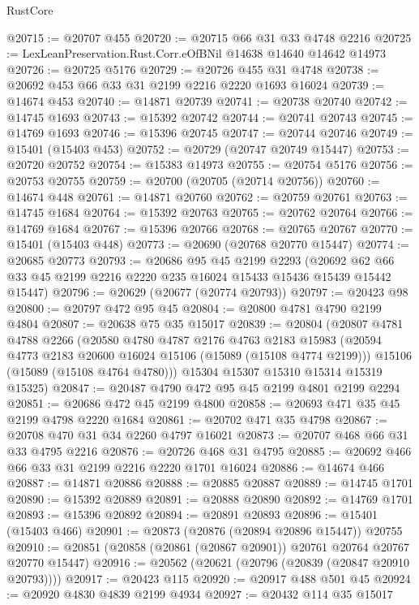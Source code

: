 \begin{lexlean}{RustCore}
\begin{coremodule}
@20715 := @20707 @455
@20720 := @20715 @66 @31 @33 @4748 @2216
@20725 := LexLeanPreservation.Rust.Corr.eOfBNil @14638 @14640 @14642 @14973
@20726 := @20725 @5176
@20729 := @20726 @455 @31 @4748
@20738 := @20692 @453 @66 @33 @31 @2199 @2216 @2220 @1693 @16024
@20739 := @14674 @453
@20740 := @14871 @20739
@20741 := @20738 @20740
@20742 := @14745 @1693
@20743 := @15392 @20742
@20744 := @20741 @20743
@20745 := @14769 @1693
@20746 := @15396 @20745
@20747 := @20744 @20746
@20749 := @15401 (@15403 @453)
@20752 := @20729 (@20747 @20749 @15447)
@20753 := @20720 @20752
@20754 := @15383 @14973
@20755 := @20754 @5176
@20756 := @20753 @20755
@20759 := @20700 (@20705 (@20714 @20756))
@20760 := @14674 @448
@20761 := @14871 @20760
@20762 := @20759 @20761
@20763 := @14745 @1684
@20764 := @15392 @20763
@20765 := @20762 @20764
@20766 := @14769 @1684
@20767 := @15396 @20766
@20768 := @20765 @20767
@20770 := @15401 (@15403 @448)
@20773 := @20690 (@20768 @20770 @15447)
@20774 := @20685 @20773
@20793 := @20686
    @95
    @45
    @2199
    @2293
    (@20692 @62 @66 @33 @45 @2199 @2216 @2220 @235 @16024 @15433 @15436 @15439 @15442 @15447)
@20796 := @20629 (@20677 (@20774 @20793))
@20797 := @20423 @98
@20800 := @20797 @472 @95 @45
@20804 := @20800 @4781 @4790 @2199 @4804
@20807 := @20638 @75 @35 @15017
@20839 := @20804
    (@20807
      @4781
      @4788
      @2266
      (@20580
        @4780
        @4787
        @2176
        @4763
        @2183
        @15983
        (@20594 @4773 @2183 @20600 @16024 @15106 (@15089 (@15108 @4774 @2199)))
        @15106
        (@15089 (@15108 @4764 @4780)))
      @15304
      @15307
      @15310
      @15314
      @15319
      @15325)
@20847 := @20487 @4790 @472 @95 @45 @2199 @4801 @2199 @2294
@20851 := @20686 @472 @45 @2199 @4800
@20858 := @20693 @471 @35 @45 @2199 @4798 @2220 @1684
@20861 := @20702 @471 @35 @4798
@20867 := @20708 @470 @31 @34 @2260 @4797 @16021
@20873 := @20707 @468 @66 @31 @33 @4795 @2216
@20876 := @20726 @468 @31 @4795
@20885 := @20692 @466 @66 @33 @31 @2199 @2216 @2220 @1701 @16024
@20886 := @14674 @466
@20887 := @14871 @20886
@20888 := @20885 @20887
@20889 := @14745 @1701
@20890 := @15392 @20889
@20891 := @20888 @20890
@20892 := @14769 @1701
@20893 := @15396 @20892
@20894 := @20891 @20893
@20896 := @15401 (@15403 @466)
@20901 := @20873 (@20876 (@20894 @20896 @15447)) @20755
@20910 := @20851 (@20858 (@20861 (@20867 @20901)) @20761 @20764 @20767 @20770 @15447)
@20916 := @20562 (@20621 (@20796 (@20839 (@20847 @20910 @20793))))
@20917 := @20423 @115
@20920 := @20917 @488 @501 @45
@20924 := @20920 @4830 @4839 @2199 @4934
@20927 := @20432 @114 @35 @15017

\end{coremodule}
\end{lexlean}

